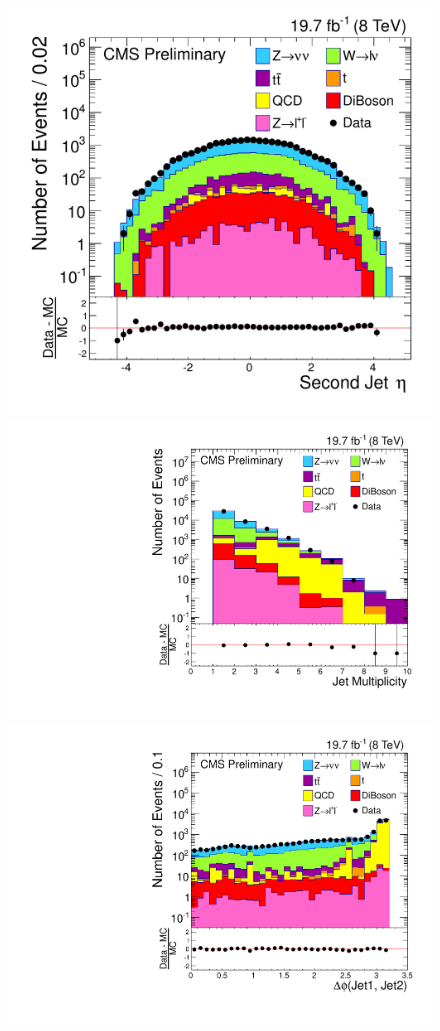 \begin{figure}
\begin{center}
  \includegraphics[scale=0.32]     {Figures/sus13009/nocut/Jet2Eta_mod.pdf}
  \includegraphics[scale=0.32]     {Figures/sus13009/nocut/NJet.pdf}
  \includegraphics[scale=0.32]     {Figures/sus13009/nocut/dPhi_Jet1_Jet2.pdf}

\end{center}
\end{figure}
